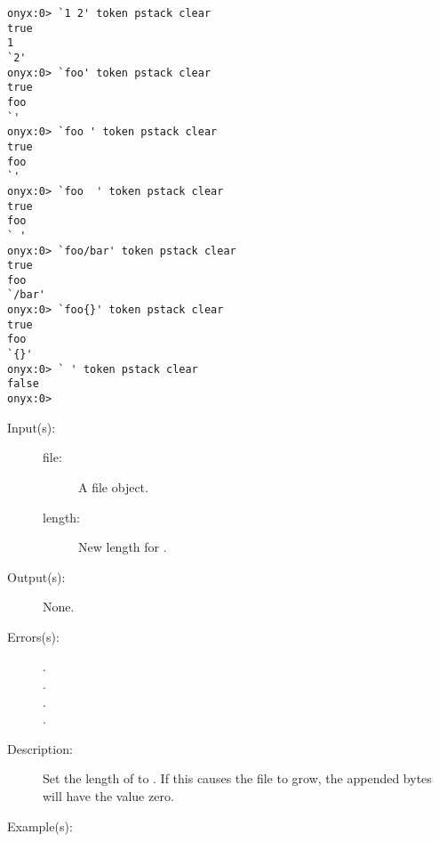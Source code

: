 \begin{description}
\begin{description}
\begin{verbatim}
onyx:0> `1 2' token pstack clear
true
1
`2'
onyx:0> `foo' token pstack clear
true
foo
`'
onyx:0> `foo ' token pstack clear
true
foo
`'
onyx:0> `foo  ' token pstack clear
true
foo
` '
onyx:0> `foo/bar' token pstack clear
true
foo
`/bar'
onyx:0> `foo{}' token pstack clear
true
foo
`{}'
onyx:0> ` ' token pstack clear
false
onyx:0>
		\end{verbatim}
	\end{description}
\label{systemdict:truncate}
\item[{\onyxop{file length}{truncate}{--}}: ]
	\begin{description}\item[]
	\item[Input(s): ]
		\begin{description}\item[]
		\item[file: ]
			A file object.
		\item[length: ]
			New length for .
		\end{description}
	\item[Output(s): ] None.
	\item[Errors(s): ]
		\begin{description}\item[]
		\item[.]
		\item[.]
		\item[.]
		\item[.]
		\end{description}
	\item[Description: ]
		Set the length of  to .  If this
		causes the file to grow, the appended bytes will have the
		value zero.
	\item[Example(s): ]\begin{verbatim}


\end{verbatim}
\end{description}
\end{description}
